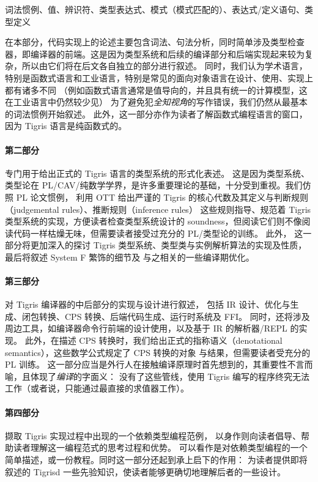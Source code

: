 \documentclass[a4paper, 11pt]{article}
\theoremstyle{remark}\newtheorem*{remark}{Remark}
\theoremstyle{definition}\newtheorem*{definition}{Definition}
\begin{document}
\begin{center}
  词法惯例、值、辨识符、类型表达式、模式（模式匹配的）、表达式/定义语句、类型定义
\end{center}
在本部分，代码实现上的论述主要包含词法、句法分析，同时简单涉及类型检查器，即编译器的前端。这是因为类型系统和后续的编译部分和后端实现起来较为复杂，所以由它们将在后文各自独立的部分进行叙述。
同时，我们认为学术语言，特别是函数式语言和工业语言，特别是常见的面向对象语言在设计、使用、实现上都有诸多不同
（例如函数式语言通常是值导向的，并且具有统一的计算模型，这在工业语言中仍然较少见）
为了避免犯\emph{全知视角}的写作错误，我们仍然从最基本的词法惯例开始叙述。
此外，这一部分亦作为读者了解函数式编程语言的窗口，因为 Tigris 语言是纯函数式的。

\paragraph{第二部分}专门用于给出正式的 Tigris 语言的类型系统的形式化表述。
这是因为类型系统、类型论在 PL/CAV/纯数学学界，是许多重要理论的基础，十分受到重视。我们仿照 PL 论文惯例，
利用 OTT 给出严谨的 Tigris 的核心代数及其定义与判断规则（judgemental rules）、推断规则（inference rules）
这些规则指导、规范着 Tigris 类型系统的实现，方便读者检查类型系统设计的 soundness，但阅读它们则不像阅读代码一样枯燥无味，但需要读者接受过充分的 PL/类型论的训练。
此外，
这一部分将更加深入的探讨 Tigris 类型系统、类型类与实例解析算法的实现及性质，最后将叙述 System F 繁饰的细节及
与之相关的一些编译期优化。

\paragraph{第三部分}对 Tigris 编译器的中后部分的实现与设计进行叙述，
包括 IR 设计、优化与生成、闭包转换、CPS 转换、后端代码生成、运行时系统及 FFI。
同时，还将涉及周边工具，如编译器命令行前端的设计使用，以及基于 IR 的解析器/REPL 的实现。
此外，在描述 CPS 转换时，我们给出正式的指称语义（denotational semantics），这些数学公式规定了 CPS 转换的对象
与结果，但需要读者受充分的 PL 训练。
这一部分应当是外行人在接触编译原理时首先想到的，其重要性不言而喻，且体现了\emph{编译}的字面义：
没有了这些管线，使用 Tigris 编写的程序终究无法工作（或者说，只能通过最直接的求值器工作）。

\paragraph{第四部分}撷取 Tigris 实现过程中出现的一个依赖类型编程范例，
以身作则向读者倡导、帮助读者理解这一编程范式的思考过程和优势。
可以看作是对依赖类型编程的一个简单描述，或一份教程。同时这一部分还起到承上启下的作用：
为读者提供即将叙述的 Tigrisd 一些先验知识，使读者能够更确切地理解后者的一些设计。
\end{document}
